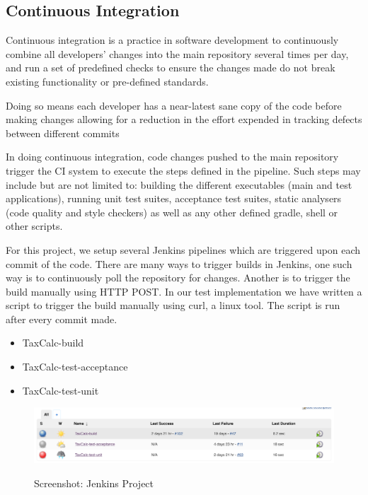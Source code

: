 \subsection{Continuous Integration}
Continuous integration is a practice in software development to continuously combine all developers’ changes into the main repository several times per day, and run a set of predefined checks to ensure the changes made do not break existing functionality or pre-defined standards. 
\par
Doing so means each developer has a near-latest sane copy of the code before making changes allowing for a reduction in the effort expended in tracking defects between different commits  
\par
In doing continuous integration, code changes pushed to the main repository  trigger the CI system to execute the steps defined in the pipeline.
Such steps may include but are not limited to: building the different executables (main and test applications), running unit test suites, acceptance test suites, static analysers (code quality and style checkers) as well as any other defined gradle, shell or other scripts.  
\par
For this project, we setup several Jenkins pipelines which are triggered upon each commit of the code. There are many ways to trigger builds in Jenkins, one such way is to continuously poll the repository for changes. 
Another is to trigger the build manually using HTTP POST. In our test implementation we have written a script to trigger the build manually using curl, a linux tool. The script is run after every commit made. 
\begin{itemize}
    \item TaxCalc-build
	\item TaxCalc-test-acceptance
	\item TaxCalc-test-unit
\end{itemize}

\begin{figure}[H]
\includegraphics[scale=0.4]{res/jenkins.png}
\label{fig:jenkins-screenshot}
\caption{Screenshot: Jenkins Project}
\end{figure}